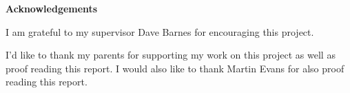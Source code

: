 \thispagestyle{empty}

\begin{center}
    {\LARGE\bf Acknowledgements}
\end{center}

I am grateful to my supervisor Dave Barnes for encouraging this project.

I'd like to thank my parents for supporting my work on this project as well as proof reading this report.  I would also like to thank Martin Evans for also proof reading this report.
